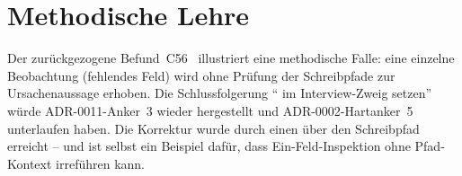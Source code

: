 \section{Methodische Lehre}\label{sec:methodische-lehre}

Der zur{\"u}ckgezogene Befund~C56~\cite{zenodo-agora} illustriert eine methodische Falle: eine einzelne Beobachtung (fehlendes Feld) wird ohne Pr{\"u}fung der Schreibpfade zur Ursachenaussage erhoben. Die Schlussfolgerung \enquote{ im Interview-Zweig setzen} w{\"u}rde ADR-0011-Anker~3 wieder hergestellt und ADR-0002-Hartanker~5 unterlaufen haben. Die Korrektur wurde durch einen  {\"u}ber den Schreibpfad erreicht -- und ist selbst ein Beispiel daf{\"u}r, dass Ein-Feld-Inspektion ohne Pfad-Kontext irref{\"u}hren kann.